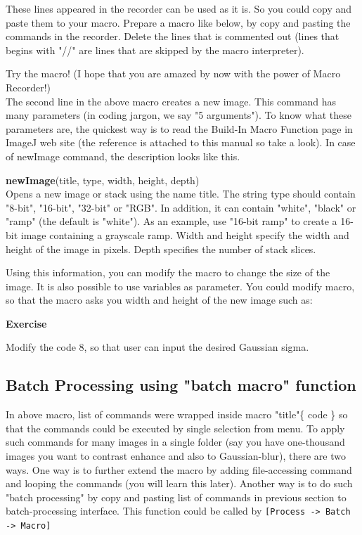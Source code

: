 \documentclass[11pt,a4paper,oneside]{report}
\newenvironment{indentexercise}[1]%
{{\setlength{\leftmargin}{2em}}%
\textbf{Exercise \thesubsection-#1}%
\begin{list}{}%
	\item%
}
{\end{list}}
\newenvironment{indentCom}%
{\begin{list}{}%
         {\setlength{\leftmargin}{1em}}%
         \item[]%
}
{\end{list}}
\newcommand{\ijmenu}[1]{\texttt{\small#1}}
\begin{document}
These lines appeared in the recorder can be used as it is. So you could copy and paste them to your macro. Prepare a macro like below, by copy and pasting the commands in the recorder. Delete the lines that is commented out (lines that begins with "//" are lines that are skipped by the macro interpreter).


Try the macro! (I hope that you are amazed by now with the power of Macro Recorder!)\\
 
The second line in the above macro creates a new image. This command has many parameters (in coding jargon, we say "5 arguments"). To know what these parameters are, the quickest way is to read the Build-In Macro Function page in ImageJ web site  (the reference is attached to this manual so take a look).  In case of newImage command, the description looks like this. 

\begin{indentCom}
\textbf{newImage}(title, type, width, height, depth)\\
Opens a new image or stack using the name title. The string type should contain "8-bit", "16-bit", "32-bit" or "RGB". In addition, it can contain "white", "black" or "ramp" (the default is "white"). As an example, use "16-bit ramp" to create a 16-bit image containing a grayscale ramp. Width and height specify the width and height of the image in pixels. Depth specifies the number of stack slices.
\end{indentCom}
Using this information, you can modify the macro to change the size of the image. It is also possible to use variables as parameter. You could modify macro, so that the macro asks you width and height of the new image such as:


\begin{indentexercise}{1}
Modify the code 8, so that user can input the desired Gaussian sigma.
\end{indentexercise}


\subsection{Batch Processing using "batch macro" function}
In above macro, list of commands were wrapped inside macro "title"\{ code \} so that the commands could be executed by single selection from menu. To apply such commands for many images in a single folder (say you have one-thousand images you want to contrast enhance and also to Gaussian-blur), there are two ways. One way is to further extend the macro by adding file-accessing command and looping the commands (you will learn this later). Another way is to do such "batch processing" by copy and pasting list of commands in previous section to batch-processing interface. This function could be called by \ijmenu{[Process -> Batch -> Macro]}
\end{document}
